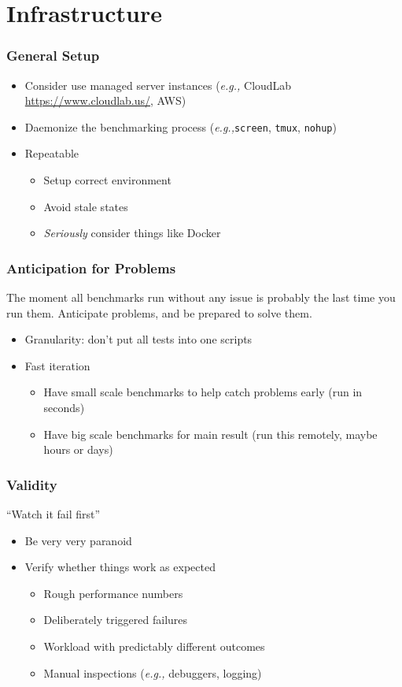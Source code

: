 \documentclass[xcolor={dvipsnames},aspectratio=149]{beamer}
\def\eg{\emph{e.g.,}\xspace}
\begin{document}
\section{Infrastructure}
\begin{frame}
  \frametitle{General Setup}
  \begin{itemize}
  \item Consider use managed server instances (\eg CloudLab \url{https://www.cloudlab.us/}, AWS)
  \item Daemonize the benchmarking process (\eg \texttt{screen}, \texttt{tmux}, \texttt{nohup})
  \item Repeatable
    \begin{itemize}
    \item Setup correct environment
    \item Avoid stale states
    \item \textit{Seriously} consider things like Docker
    \end{itemize}
  \end{itemize}
\end{frame}

\begin{frame}
  \frametitle{Anticipation for Problems}
  The moment all benchmarks run without any issue is probably the last time you run them.
  Anticipate problems, and be prepared to solve them.
  \begin{itemize}
  \item Granularity: don't put all tests into one scripts
  \item Fast iteration
    \begin{itemize}
    \item Have small scale benchmarks to help catch problems early (run in seconds)
    \item Have big scale benchmarks for main result (run this remotely, maybe hours or days)
    \end{itemize}
  \end{itemize}
\end{frame}

\begin{frame}
  \frametitle{Validity}
  ``Watch it fail first''
  \begin{itemize}
  \item Be very very paranoid
  \item Verify whether things work as expected
    \begin{itemize}
    \item Rough performance numbers
    \item Deliberately triggered failures
    \item Workload with predictably different outcomes
    \item Manual inspections (\eg debuggers, logging)
    \end{itemize}
  \end{itemize}
\end{frame}
\end{document}
